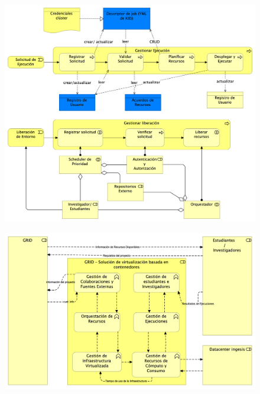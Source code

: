 \begin{figure}[H]
    \centering
    \includegraphics[width=\textwidth]{tablas-images/cp6/Business-Process-View.png}
\end{figure}
\begin{figure}[H]
    \centering
    \includegraphics[width=\textwidth]{tablas-images/cp6/Business-Function-View.png}
\end{figure}

